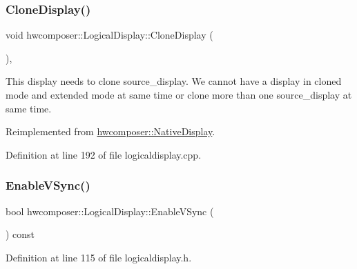 \subsubsection{\texorpdfstring{Clone\+Display()}{CloneDisplay()}}
{\footnotesize\ttfamily void hwcomposer\+::\+Logical\+Display\+::\+Clone\+Display (\begin{DoxyParamCaption}\item[{\mbox{\hyperlink{classhwcomposer_1_1NativeDisplay}{Native\+Display}} $\ast$}]{ }\end{DoxyParamCaption})\hspace{0.3cm}{\ttfamily [override]}, {\ttfamily [virtual]}}

This display needs to clone source\+\_\+display. We cannot have a display in cloned mode and extended mode at same time or clone more than one source\+\_\+display at same time. 

Reimplemented from \mbox{\hyperlink{classhwcomposer_1_1NativeDisplay_ad244fa57c9c6380fb04bfd57da3cb28b}{hwcomposer\+::\+Native\+Display}}.



Definition at line 192 of file logicaldisplay.\+cpp.


\begin{DoxyCode}{0}
\end{DoxyCode}
\mbox{\label{classhwcomposer_1_1LogicalDisplay_ab519c7398b8aad01c68ecc78e3e831a1}} 
\subsubsection{\texorpdfstring{Enable\+V\+Sync()}{EnableVSync()}}
{\footnotesize\ttfamily bool hwcomposer\+::\+Logical\+Display\+::\+Enable\+V\+Sync (\begin{DoxyParamCaption}{ }\end{DoxyParamCaption}) const\hspace{0.3cm}{\ttfamily [inline]}}



Definition at line 115 of file logicaldisplay.\+h.


\begin{DoxyCode}{0}
\end{DoxyCode}
\mbox{\label{classhwcomposer_1_1LogicalDisplay_a8a88b08fd54dd02debe436718c569fff}} 
